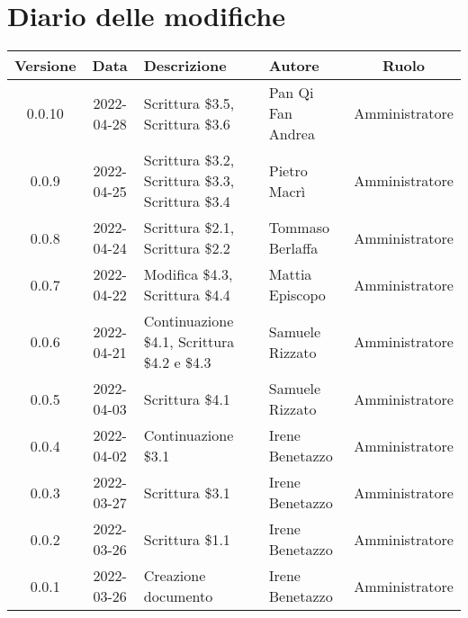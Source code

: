 \section*{Diario delle modifiche}
	\begin{center}
	\renewcommand{\arraystretch}{1.8} %
	\begin{tabular}{ |c|c|m{12em}|m{7em}|c| }
	\hline
	\textbf{Versione} & \textbf{Data} & \textbf{Descrizione} &  \textbf{Autore} &  \textbf{Ruolo} \\ %
	\hline
	0.0.10 & 2022-04-28 & Scrittura \$3.5, Scrittura \$3.6 & Pan Qi Fan \newline Andrea & Amministratore\\
	\hline
	0.0.9 & 2022-04-25 & Scrittura \$3.2, Scrittura \$3.3, Scrittura \$3.4 & Pietro Macrì & Amministratore\\
	\hline
	0.0.8 & 2022-04-24 & Scrittura \$2.1, Scrittura \$2.2 & Tommaso \newline Berlaffa & Amministratore\\
	\hline
	0.0.7 & 2022-04-22 & Modifica \$4.3, Scrittura \$4.4 & Mattia \newline Episcopo & Amministratore\\
	\hline
	0.0.6 & 2022-04-21 & Continuazione \$4.1, Scrittura \$4.2 e \$4.3 & Samuele \newline Rizzato & Amministratore\\ %
	\hline
	0.0.5 & 2022-04-03 & Scrittura \$4.1 & Samuele \newline Rizzato & Amministratore\\
	\hline
	0.0.4 & 2022-04-02 & Continuazione \$3.1 & Irene Benetazzo & Amministratore\\
	\hline
	0.0.3 & 2022-03-27 & Scrittura \$3.1 & Irene Benetazzo & Amministratore\\
	\hline
	0.0.2 & 2022-03-26 & Scrittura \$1.1 & Irene Benetazzo & Amministratore\\
	\hline
    0.0.1 & 2022-03-26 & Creazione documento & Irene Benetazzo & Amministratore\\
	\hline
	\end{tabular}
	\end{center}
	\newpage